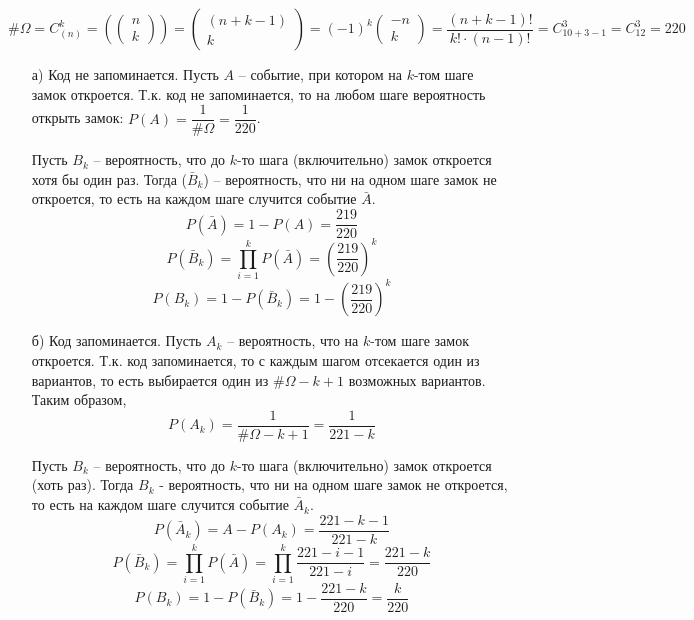 \[ \# \Omega = C_{(n)}^k = \left( \begin{pmatrix} n \\ k \end{pmatrix} \right) = \begin{pmatrix} (n+k-1) \\ k \end{pmatrix} = (-1)^k\begin{pmatrix} -n \\ k \end{pmatrix} = \dfrac{(n+k-1)!}{k! \cdot (n-1)!} = C_{10+3-1}^{3} = C_{12}^3 = 220 \]
\begin{enumerate}
	\item[а)] Код не запоминается. 
	Пусть $A$ – событие, при котором на $k$-том шаге замок откроется. Т.к. код не запоминается, то на любом шаге вероятность открыть замок: $P(A) = \dfrac{1}{\# \Omega} = \dfrac{1}{220}$.
	
	\noindent Пусть $B_k$ – вероятность, что до $k$-то шага (включительно) замок откроется хотя бы один раз. Тогда ($\bar B_k$) – вероятность, что ни на одном шаге замок не откроется, то есть на каждом шаге случится событие $\bar A$.
	\[ P(\bar A) = 1 - P(A) = \dfrac{219}{220} \]
	\[ P(\bar B_k) = \prod_{i=1}^{k} P(\bar A) = \left( \dfrac{219}{220} \right)^k \]
	\[ P(B_k) = 1 - P(\bar B_k) = 1 - \left( \dfrac{219}{220} \right)^k \]
	
	\item[б)] Код запоминается.
	Пусть $A_k$ – вероятность, что на $k$-том шаге замок откроется. Т.к. код запоминается, то с каждым шагом отсекается один из вариантов, то есть выбирается один из $\# \Omega - k + 1$ возможных вариантов. Таким образом,
	\[ P(A_k) = \dfrac{1}{\# \Omega - k + 1} = \dfrac{1}{221 - k} \]
	
	\noindent Пусть $B_k$ – вероятность, что до $k$-то шага (включительно) замок откроется (хоть раз). Тогда $B_k$ - вероятность, что ни на одном шаге замок не откроется, то есть на каждом шаге случится событие $\bar A_k$.
	\[ P(\bar A_k) = A - P(A_k) = \dfrac{221 - k - 1}{221 - k} \]
	\[ P(\bar B_k) = \prod_{i=1}^{k} P(\bar A) = \prod_{i=1}^{k} \dfrac{221 - i - 1}{221 - i} = \dfrac{221 - k}{220} \]
	\[ P(B_k) = 1 - P(\bar B_k) = 1 - \dfrac{221 - k}{220} = \dfrac{k}{220} \]
\end{enumerate}

